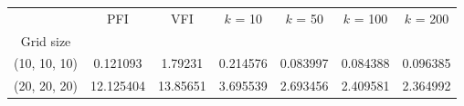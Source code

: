 \begin{tabular}{ccccccc}
\toprule
{} &        PFI &       VFI &  $k$ = 10 &  $k$ = 50 &  $k$ = 100 &  $k$ = 200 \\
Grid size    &            &           &           &           &            &            \\
\midrule
(10, 10, 10) &   0.121093 &   1.79231 &  0.214576 &  0.083997 &   0.084388 &   0.096385 \\
(20, 20, 20) &  12.125404 &  13.85651 &  3.695539 &  2.693456 &   2.409581 &   2.364992 \\
\bottomrule
\end{tabular}
